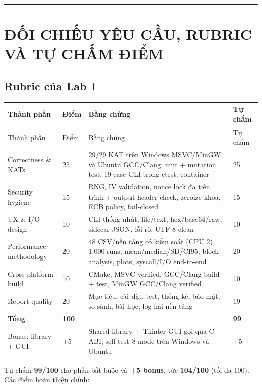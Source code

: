 \documentclass[12pt,a4paper,oneside]{report}
\begin{document}
\par\noindent\rule{\textwidth}{0.4pt}


\chapter{ĐỐI CHIẾU YÊU CẦU, RUBRIC VÀ TỰ CHẤM ĐIỂM}


\section{Rubric của Lab 1}


\begin{longtable}{p{}p{}p{}p{}}
\toprule
Thành phần & Điểm & Bằng chứng & Tự chấm \\
\midrule
\endfirsthead
\toprule
Thành phần & Điểm & Bằng chứng & Tự chấm \\
\midrule
\endhead
Correctness \& KATs & 25 & 29/29 KAT trên Windows MSVC/MinGW và Ubuntu GCC/Clang; unit + mutation test; 19-case CLI trong ctest; container & 25 \\
Security hygiene & 15 & RNG, IV validation, nonce lock đa tiến trình + output header check, zeroize khoá, ECB policy, fail-closed & 15 \\
UX \& I/O design & 10 & CLI thống nhất, file/text, hex/base64/raw, sidecar JSON, lỗi rõ, UTF-8 clean & 10 \\
Performance methodology & 20 & 48 CSV/nền tảng có kiểm soát (CPU 2), 1.000 runs, mean/median/SD/CI95, block analysis, plots, syscall/I/O end-to-end & 20 \\
Cross-platform build & 10 & CMake, MSVC verified, GCC/Clang build + test, MinGW GCC/Clang verified & 10 \\
Report quality & 20 & Mục tiêu, cài đặt, test, thống kê, bảo mật, so sánh, bài học; log hai nền tảng & 19 \\
\textbf{Tổng} & \textbf{100} &  & \textbf{99} \\
Bonus: library + GUI & +5 & Shared library + Tkinter GUI gọi qua C ABI; self-test 8 mode trên Windows và Ubuntu & +5 \\
\bottomrule
\end{longtable}


Tự chấm \textbf{99/100} cho phần bắt buộc và \textbf{+5 bonus}, tức \textbf{104/100} (tối đa 100). Các điểm hoàn thiện chính:
\end{document}
